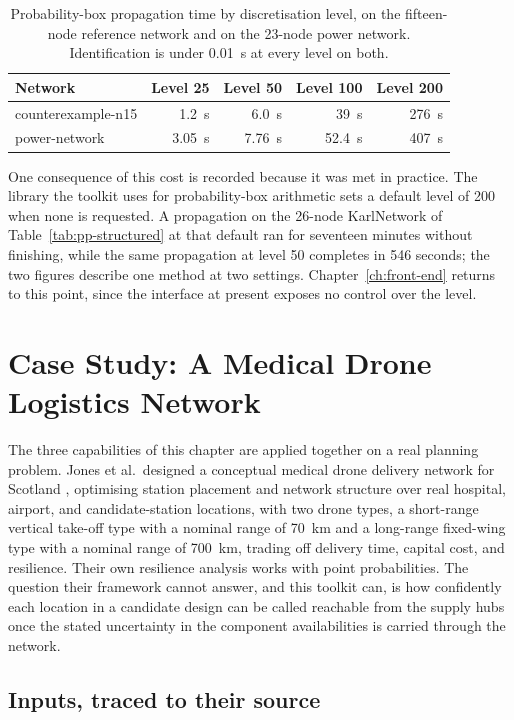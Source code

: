 \documentclass[12pt]{report}
\begin{document}
\begin{table}[htbp]
\centering
\caption{Probability-box propagation time by discretisation level, on the fifteen-node
reference network and on the 23-node power network. Identification is under 0.01~s at every
level on both.}
\label{tab:pp-pbox-cost}
\small
\renewcommand{\arraystretch}{1.15}
\begin{tabular}{lrrrr}
\toprule
Network & Level 25 & Level 50 & Level 100 & Level 200 \\
\midrule
counterexample-n15 & 1.2~s & 6.0~s & 39~s & 276~s \\
power-network & 3.05~s & 7.76~s & 52.4~s & 407~s \\
\bottomrule
\end{tabular}
\end{table}

One consequence of this cost is recorded because it was met in practice. The library the
toolkit uses for probability-box arithmetic sets a default level of 200 when none is
requested. A propagation on the 26-node KarlNetwork of Table~\ref{tab:pp-structured} at
that default ran for seventeen minutes without finishing, while the same propagation at
level 50 completes in 546 seconds; the two figures describe one method at two settings.
Chapter~\ref{ch:front-end} returns to this point, since the interface at present exposes no
control over the level.
\section{Case Study: A Medical Drone Logistics Network}
\label{sec:pp-case}

The three capabilities of this chapter are applied together on a real planning problem. Jones et al.\ designed a conceptual medical drone delivery network for Scotland \cite{jones2025conceptual}, optimising station placement and network structure over real hospital, airport, and candidate-station locations, with two drone types, a short-range vertical take-off type with a nominal range of 70~km and a long-range fixed-wing type with a nominal range of 700~km, trading off delivery time, capital cost, and resilience. Their own resilience analysis works with point probabilities. The question their framework cannot answer, and this toolkit can, is how confidently each location in a candidate design can be called reachable from the supply hubs once the stated uncertainty in the component availabilities is carried through the network.

\subsection{Inputs, traced to their source}
\label{sec:pp-case-inputs}
\end{document}
